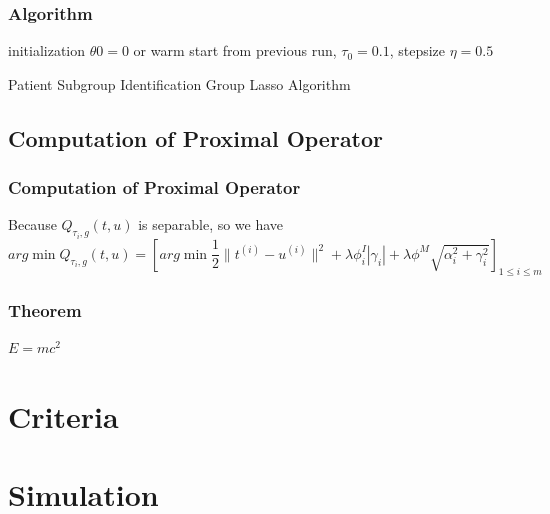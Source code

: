 \documentclass{beamer}
\begin{document}
\begin{frame}
\frametitle{Algorithm}
\begin{algorithm}[H]
 initialization $\theta0=0$ or warm start from previous run, $\tau_0=0.1$, stepsize $\eta=0.5$\;
 \caption{Patient Subgroup Identification Group Lasso Algorithm}
\end{algorithm}


\end{frame}

\subsection{Computation of Proximal Operator}

\begin{frame}
\frametitle{Computation of Proximal Operator}
Because $Q_{\tau_i,g}(t,u)$ is separable, so we have $$arg\min Q_{\tau_i,g}(t,u) =[ arg\min \frac{1}{2}\parallel t^{(i)}-u^{(i)}\parallel^2+\lambda\phi_i^I|\gamma_i|+\lambda\phi^M\sqrt{\alpha_i^2+\gamma_i^2}]_{1\le i\le m }$$
\frametitle{Theorem}
\begin{theorem}[]
$E = mc^2$
\end{theorem}
\end{frame}


\section{Criteria}

\section{Simulation}
\end{document}
